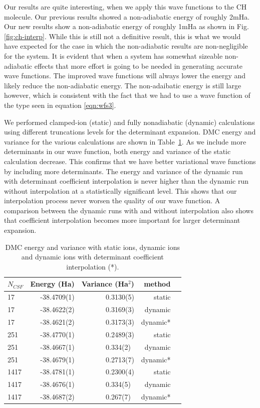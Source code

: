 \documentclass[aip,jcp,numerical,reprint]{revtex4-1}
\begin{document}
Our results are quite interesting, when we apply this wave functions to the CH molecule.  Our previous results showed a non-adiabatic energy of roughly 2mHa. Our new results show a non-adiabatic energy of roughly 1mHa as shown in Fig.\ref{fig:ch-interp}.  While this is still not a definitive result, this is what we would have expected for the case in which the non-adiabatic results are non-negligible for the system.  It is evident that when a system has somewhat sizeable non-adiabatic effects that more effort is going to be needed in generating accurate wave functions.  The improved wave functions will always lower the energy and likely reduce the non-adiabatic energy.  The non-adaibatic energy is still large however, which is consistent with the fact that we had to use a wave function of the type seen in equation \eqref{eqn:wfs3}.

We performed clamped-ion (static) and fully nonadiabatic (dynamic) calculations using different truncations levels for the determinant expansion. DMC energy and variance for the various calculations are shown in Table~\ref{tab:energy}. As we include more determinants in our wave function, both energy and variance of the static calculation decrease. This confirms that we have better variational wave functions by including more determinants. The energy and variance of the dynamic run with determinant coefficient interpolation is never higher than the dynamic run without interpolation at a statistically significant level. This shows that our interpolation process never worsen the quality of our wave function. A comparison between the dynamic runs with and without interpolation also shows that coefficient interpolation becomes more important for larger determinant expansion.

\begin{table}[h]
\begin{tabular}{lrrrr}
\hline\hline
$N_{CSF}$ & Energy (Ha) & Variance (Ha$^2$) & method \\
\hline
17   & -38.4709(1) &  0.3130(5) &    static \\
17   & -38.4622(2) &  0.3169(3) &   dynamic \\
17   & -38.4621(2) &  0.3173(3) &  dynamic* \\
251  & -38.4770(1)&  0.2489(3) &    static \\
251  & -38.4667(1) &  0.334(2)~  &   dynamic \\
251  & -38.4679(1) &  0.2713(7) &  dynamic* \\
1417 & -38.4781(1) &  0.2300(4) &    static \\
1417 & -38.4676(1) &  0.334(5)~  &   dynamic \\
1417 & -38.4687(2) &  0.267(7)~  &  dynamic* \\
\hline\hline
\end{tabular}
\caption{DMC energy and variance with static ions, dynamic ions and dynamic ions with determinant coefficient interpolation (*).\label{tab:energy}}
\end{table}
\end{document}
